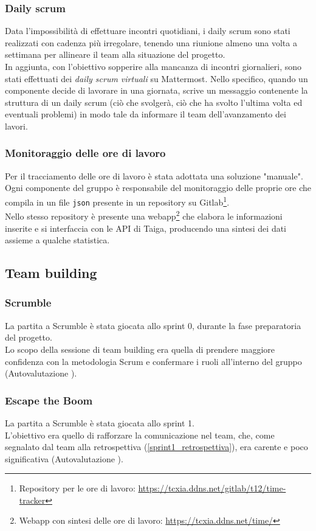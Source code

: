 \documentclass[11pt]{article}
\newcommand{\fref}[1]{\hyperref[#1]{\cref{#1}}}
\begin{document}
\subsubsection{Daily scrum}
Data l'impossibilità di effettuare incontri quotidiani, i daily scrum sono stati realizzati con cadenza più irregolare, tenendo una riunione almeno una volta a settimana
per allineare il team alla situazione del progetto.\\
In aggiunta, con l'obiettivo sopperire alla mancanza di incontri giornalieri, sono stati effettuati dei \textit{daily scrum virtuali} su Mattermost.
Nello specifico, quando un componente decide di lavorare in una giornata, scrive un messaggio contenente la struttura di un daily scrum (ciò che svolgerà, ciò che ha svolto l'ultima volta ed eventuali problemi)
in modo tale da informare il team dell'avanzamento dei lavori.

\subsubsection{Monitoraggio delle ore di lavoro}
Per il tracciamento delle ore di lavoro è stata adottata una soluzione "manuale".
Ogni componente del gruppo è responsabile del monitoraggio delle proprie ore che compila in un file \texttt{json} presente in un repository su Gitlab\footnote{Repository per le ore di lavoro: \url{https://tcxia.ddns.net/gitlab/t12/time-tracker}}.\\
Nello stesso repository è presente una webapp\footnote{Webapp con sintesi delle ore di lavoro: \url{https://tcxia.ddns.net/time/}}
che elabora le informazioni inserite e si interfaccia con le API di Taiga, producendo una sintesi dei dati assieme a qualche statistica. 


\subsection{Team building}
\subsubsection{Scrumble}
La partita a Scrumble è stata giocata allo sprint 0, durante la fase preparatoria del progetto.\\
Lo scopo della sessione di team building era quella di prendere maggiore confidenza con la metodologia Scrum e 
confermare i ruoli all'interno del gruppo (Autovalutazione \cite{gqm_scrumble}).

\subsubsection{Escape the Boom}
La partita a Scrumble è stata giocata allo sprint 1.\\
L'obiettivo era quello di rafforzare la comunicazione nel team, che, come segnalato dal team alla retrospettiva (\fref{sprint1_retrospettiva}),
era carente e poco significativa (Autovalutazione \cite{gqm_escapetheboom}).
\end{document}
